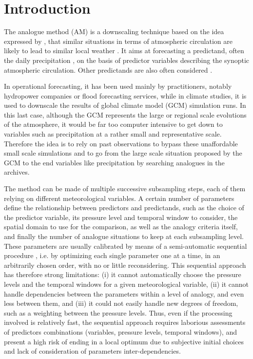 \documentclass[review]{elsarticle}
\begin{document}
\linenumbers

\section{Introduction}
\label{sec:intro}

The analogue method (AM) is a downscaling technique based on the idea expressed by \citet{Lorenz1956, Lorenz1969}, that similar situations in terms of atmospheric circulation are likely to lead to similar local weather \citep{Duband1970, Bontron2005}. It aims at forecasting a predictand, often the daily precipitation \citep[eg.][]{Guilbaud1997, Bontron2005, Bliefernicht2010, Marty2012, Horton2012, Radanovics2013, BenDaoud2015}, on the basis of predictor variables describing the synoptic atmospheric circulation. Other predictands are also often considered \citep[see][for a non-exhaustive list]{Horton2016}.

In operational forecasting, it has been used mainly by practitioners, notably hydropower companies or flood forecasting services, while in climate studies, it is used to downscale the results of global climate model (GCM) simulation runs. In this last case, although the GCM represents the large or regional scale evolutions of the atmosphere, it would be far too computer intensive to get down to variables such as precipitation at a rather small and representative scale. Therefore the idea is to rely on past observations to bypass these unaffordable small scale simulations and to go from the large scale situation proposed by the GCM to the end variables like precipitation by searching analogues in the archives. 

The method can be made of multiple successive subsampling steps, each of them relying on different meteorological variables. A certain number of parameters define the relationship between predictors and predictands, such as the choice of the predictor variable, its pressure level and temporal window to consider, the spatial domain to use for the comparison, as well as the analogy criteria itself, and finally the number of analogue situations to keep at each subsampling level. These parameters are usually calibrated by means of a semi-automatic sequential procedure \citep[see][for the details]{Bontron2004, Horton2016}, i.e. by optimizing each single parameter one at a time, in an arbitrarily chosen order, with no or little reconsidering. This sequential approach has therefore strong limitations: (i) it cannot automatically choose the pressure levels and the temporal windows for a given meteorological variable, (ii) it cannot handle dependencies between the parameters within a level of analogy, and even less between them, and (iii) it could not easily handle new degrees of freedom, such as a weighting between the pressure levels. Thus, even if the processing involved is relatively fast, the sequential approach requires laborious assessments of predictors combinations (variables, pressure levels, temporal windows), and present a high risk of ending in a local optimum due to subjective initial choices and lack of consideration of parameters inter-dependencies.
\end{document}
